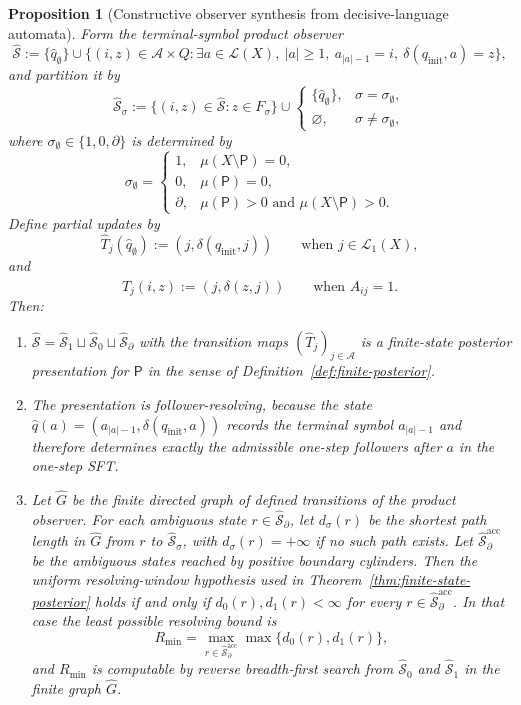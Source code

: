 \documentclass{etds}%
\numberwithin{equation}{section}
\theoremstyle{plain}
\newtheorem{proposition}[theorem]{Proposition}
\theoremstyle{definition}
\theoremstyle{remark}
\begin{document}
\begin{proposition}[Constructive observer synthesis from decisive-language automata]
Form the terminal-symbol product observer
\[
\widehat{\mathcal{S}}
:=\{\widehat q_\emptyset\}\cup
\{(i,z)\in\mathcal{A}\times Q:
\exists a\in\mathcal{L}(X),\ |a|\ge 1,\ a_{|a|-1}=i,\
\delta(q_{\mathrm{init}},a)=z\},
\]
and partition it by
\[
\widehat{\mathcal{S}}_\sigma
:=\{(i,z)\in\widehat{\mathcal{S}}:z\in F_\sigma\}
\cup
\begin{cases}
\{\widehat q_\emptyset\},& \sigma=\sigma_\emptyset,\\
\varnothing,& \sigma\neq \sigma_\emptyset,
\end{cases}
\]
where $\sigma_\emptyset\in\{1,0,\partial\}$ is determined by
\[
\sigma_\emptyset=
\begin{cases}
1,& \mu(X\setminus\mathsf{P})=0,\\
0,& \mu(\mathsf{P})=0,\\
\partial,& \mu(\mathsf{P})>0\text{ and }\mu(X\setminus\mathsf{P})>0.
\end{cases}
\]
Define partial updates by
\[
\widehat T_j(\widehat q_\emptyset):=(j,\delta(q_{\mathrm{init}},j))
\qquad\text{when }j\in\mathcal{L}_1(X),
\]
and
\[
\widehat T_j(i,z):=(j,\delta(z,j))
\qquad\text{when }A_{ij}=1.
\]
Then:
\begin{enumerate}[label=(\arabic*)]
\item $\widehat{\mathcal{S}}
  =\widehat{\mathcal{S}}_1\sqcup\widehat{\mathcal{S}}_0\sqcup
  \widehat{\mathcal{S}}_\partial$ with the transition maps
  $(\widehat T_j)_{j\in\mathcal{A}}$ is a finite-state posterior presentation
  for $\mathsf{P}$ in the sense of Definition~\ref{def:finite-posterior}.
\item The presentation is follower-resolving, because the state
  $\widehat q(a)=(a_{|a|-1},\delta(q_{\mathrm{init}},a))$ records the terminal
  symbol $a_{|a|-1}$ and therefore determines exactly the admissible one-step
  followers after $a$ in the one-step SFT.
\item Let $\widehat G$ be the finite directed graph of defined transitions of
  the product observer.  For each ambiguous state
  $r\in\widehat{\mathcal{S}}_\partial$, let $d_\sigma(r)$ be the shortest path
  length in $\widehat G$ from $r$ to $\widehat{\mathcal{S}}_\sigma$, with
  $d_\sigma(r)=+\infty$ if no such path exists.  Let
  $\widehat{\mathcal{S}}_\partial^{\mathrm{acc}}$ be the ambiguous states
  reached by positive boundary cylinders.  Then the uniform
  resolving-window hypothesis used in
  Theorem~\ref{thm:finite-state-posterior} holds if and only if
  $d_0(r),d_1(r)<\infty$ for every
  $r\in\widehat{\mathcal{S}}_\partial^{\mathrm{acc}}$.  In that case the
  least possible resolving bound is
  \[
  R_{\min}
  =\max_{r\in\widehat{\mathcal{S}}_\partial^{\mathrm{acc}}}
  \max\{d_0(r),d_1(r)\},
  \]
  and $R_{\min}$ is computable by reverse breadth-first search from
  $\widehat{\mathcal{S}}_0$ and $\widehat{\mathcal{S}}_1$ in the finite graph
  $\widehat G$.
\end{enumerate}
\end{proposition}
\end{document}
